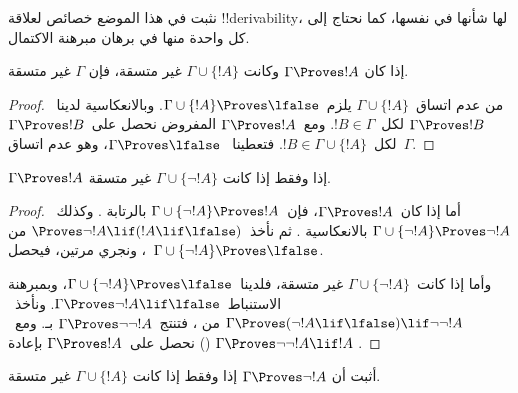 \documentclass[../../../include/open-logic-section]{subfiles}
\begin{document}
      {}
      {}


نثبت في هذا الموضع خصائص لعلاقة !!{derivability}، لها شأنها في نفسها،
كما نحتاج إلى كل واحدة منها في برهان مبرهنة الاكتمال.

\begin{prop}
  إذا كان $\Gamma \Proves !A$ وكانت $\Gamma \cup \{!A\}$ غير متسقة،
  فإن $\Gamma$ غير متسقة.
\end{prop}

\begin{proof}
  من عدم اتساق~$\Gamma \cup \{!A\}$ يلزم~$\Gamma \cup \{!A\}
  \Proves \lfalse$. وبالانعكاسية 
  لدينا~$\Gamma
  \Proves !B$ لكل~$!B \in \Gamma$. ومع~$\Gamma \Proves !A$
  المفروض نحصل على~$\Gamma \Proves !B$ لكل~$!B \in \Gamma \cup
  \{!A\}$. فتعطينا ~$\Gamma \Proves
  \lfalse$، وهو عدم اتساق~$\Gamma$.
\end{proof}

\begin{prop}
$\Gamma \Proves !A$ إذا وفقط إذا كانت $\Gamma \cup \{\lnot !A\}$ غير متسقة.
\end{prop}

\begin{proof}
أما إذا كان~$\Gamma \Proves !A$، فإن~$\Gamma \cup \{\lnot !A\}
\Proves !A$ بالرتابة .
وكذلك~$\Gamma \cup
\{\lnot !A\} \Proves \lnot !A$ بالانعكاسية .
ثم نأخذ~$\Proves \lnot !A \lif (!A \lif \lfalse)$ من
، ونجري  مرتين،
فيحصل~$\Gamma \cup \{\lnot !A\} \Proves \lfalse$.

وأما إذا كانت~$\Gamma \cup \{\lnot !A\}$ غير متسقة، فلدينا~$\Gamma
\cup \{\lnot !A\} \Proves \lfalse$، وبمبرهنة الاستنباط~$\Gamma
\Proves \lnot !A \lif \lfalse$. ونأخذ~$\Gamma \Proves (\lnot !A
\lif \lfalse) \lif \lnot\lnot !A$ من ،
فتنتج~$\Gamma \Proves \lnot\lnot !A$ بـ.
ومع~$\Gamma \Proves \lnot\lnot !A \lif !A$ ()
نحصل على~$\Gamma \Proves !A$ بإعادة .
\end{proof}

\begin{prob}
أثبت أن $\Gamma \Proves \lnot !A$ إذا وفقط إذا كانت
$\Gamma \cup \{!A\}$ غير متسقة.
\end{prob}
\end{document}
